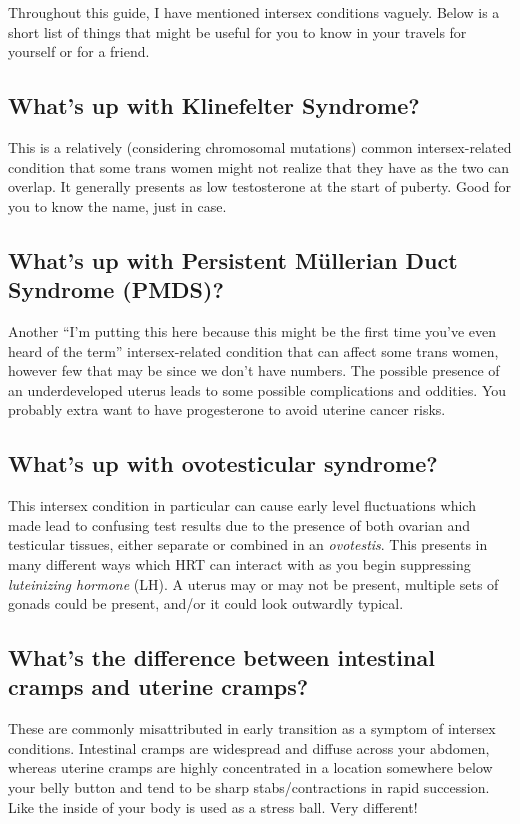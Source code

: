 \documentclass{article}
\begin{document}
Throughout this guide, I have mentioned intersex conditions vaguely. Below is a short list of things that might be useful for you to know in your travels for yourself or for a friend.

\subsection{What’s up with Klinefelter Syndrome?}

This is a relatively (considering chromosomal mutations) common intersex-related condition that some trans women might not realize that they have as the two can overlap. It generally presents as low testosterone at the start of puberty. Good for you to know the name, just in case.

\subsection{What’s up with Persistent Müllerian Duct Syndrome (PMDS)?}

Another “I’m putting this here because this might be the first time you’ve even heard of the term” intersex-related condition that can affect some trans women, however few that may be since we don’t have numbers. The possible presence of an underdeveloped uterus leads to some possible complications and oddities. You probably extra want to have progesterone to avoid uterine cancer risks.

\subsection{What's up with ovotesticular syndrome?}

This intersex condition in particular can cause early level fluctuations which made lead to confusing test results due to the presence of both ovarian and testicular tissues, either separate or combined in an \textit{ovotestis}. This presents in many different ways which HRT can interact with as you begin suppressing \textit{luteinizing hormone} (LH). A uterus may or may not be present, multiple sets of gonads could be present, and/or it could look outwardly typical.

\subsection{What’s the difference between intestinal cramps and uterine cramps?}\label{11-35}

These are commonly misattributed in early transition as a symptom of intersex conditions. Intestinal cramps are widespread and diffuse across your abdomen, whereas uterine cramps are highly concentrated in a location somewhere below your belly button and tend to be sharp stabs/contractions in rapid succession. Like the inside of your body is used as a stress ball. Very different!
\end{document}

